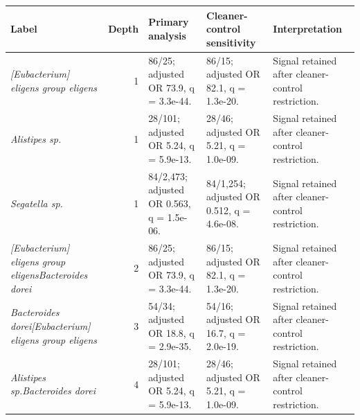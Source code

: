\begin{center}
\footnotesize
\begin{tabularx}{\textwidth}{@{} Y r Y Y Y @{}}
\toprule
Label & Depth & Primary analysis & Cleaner-control sensitivity & Interpretation
 \\
\midrule
\emph{[Eubacterium] eligens group eligens} & 1 & 86/25; adjusted OR 73.9, q = 3.3e-44. & 86/15; adjusted OR 82.1, q = 1.3e-20. & Signal retained after cleaner-control restriction. \\
\emph{Alistipes sp.} & 1 & 28/101; adjusted OR 5.24, q = 5.9e-13. & 28/46; adjusted OR 5.21, q = 1.0e-09. & Signal retained after cleaner-control restriction. \\
\emph{Segatella sp.} & 1 & 84/2,473; adjusted OR 0.563, q = 1.5e-06. & 84/1,254; adjusted OR 0.512, q = 4.6e-08. & Signal retained after cleaner-control restriction. \\
\emph{[Eubacterium] eligens group eligens}\dcstsep \emph{Bacteroides dorei} & 2 & 86/25; adjusted OR 73.9, q = 3.3e-44. & 86/15; adjusted OR 82.1, q = 1.3e-20. & Signal retained after cleaner-control restriction. \\
\emph{Bacteroides dorei}\dcstsep \emph{[Eubacterium] eligens group eligens} & 3 & 54/34; adjusted OR 18.8, q = 2.9e-35. & 54/16; adjusted OR 16.7, q = 2.0e-19. & Signal retained after cleaner-control restriction. \\
\emph{Alistipes sp.}\dcstsep \emph{Bacteroides dorei} & 4 & 28/101; adjusted OR 5.24, q = 5.9e-13. & 28/46; adjusted OR 5.21, q = 1.0e-09. & Signal retained after cleaner-control restriction. \\
\bottomrule
\end{tabularx}
\end{center}
